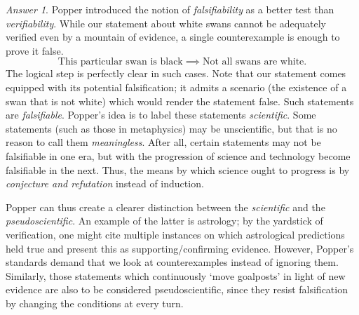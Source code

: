\documentclass[11pt]{article}
\theoremstyle{remark}
\newtheorem*{answer}{Answer}
\begin{document}
\begin{answer}
        Popper introduced the notion of \emph{falsifiability} as a better test than
        \emph{verifiability}. While our statement about white swans cannot be
        adequately verified even by a mountain of evidence, a single counterexample
        is enough to prove it false. \[
            \text{This particular swan is black} \implies \text{Not all swans are
            white}.
        \] The logical step is perfectly clear in such cases.
        Note that our statement comes equipped with its potential falsification; it
        admits a scenario (the existence of a swan that is not white) which would
        render the statement false. Such statements are \emph{falsifiable}. Popper's
        idea is to label these statements \emph{scientific}. Some statements (such as
        those in metaphysics) may be unscientific, but that is no reason to call them
        \emph{meaningless}. After all, certain statements may not be falsifiable in
        one era, but with the progression of science and technology become
        falsifiable in the next. Thus, the means by which science ought to progress
        is by \emph{conjecture and refutation} instead of induction.

        Popper can thus create a clearer distinction between the \emph{scientific}
        and the \emph{pseudoscientific}. An example of the latter is astrology; by
        the yardstick of verification, one might cite multiple instances on which
        astrological predictions held true and present this as supporting/confirming
        evidence. However, Popper's standards demand that we look at counterexamples
        instead of ignoring them. Similarly, those statements which continuously
        `move goalposts' in light of new evidence are also to be considered
        pseudoscientific, since they resist falsification by changing the conditions
        at every turn.
    \end{answer}
\end{document}
